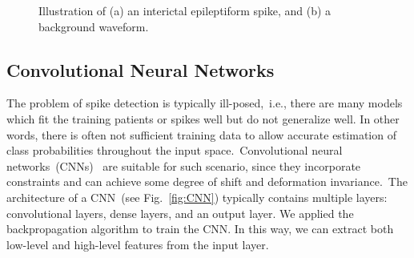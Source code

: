 \documentclass{article}
\begin{document}
\begin{figure}[!tbh]
\begin{subfigure}[b]{.22\textwidth}
            \caption{}
        \end{subfigure}

        \caption{Illustration of (a) an interictal epileptiform spike, and (b) a background waveform.}
        \label{fig:waveforms}
\end{figure}


\subsection{Convolutional Neural Networks}

The problem of spike detection is typically ill-posed,~i.e., there are many models which fit the training patients or spikes well but do not generalize well.
In other words, there is often not sufficient training data to allow accurate estimation of class probabilities throughout the input space.~Convolutional neural networks~(CNNs)~\cite{lawrence1997face} are suitable for such scenario, since they incorporate constraints and can achieve some degree of shift and deformation invariance.~The architecture of a CNN~(see Fig.~\ref{fig:CNN}) typically contains multiple layers: convolutional layers, dense layers, and an output layer.
We applied the backpropagation algorithm to train the CNN. In this way, we can extract both low-level and high-level features from the input layer.
\end{document}
